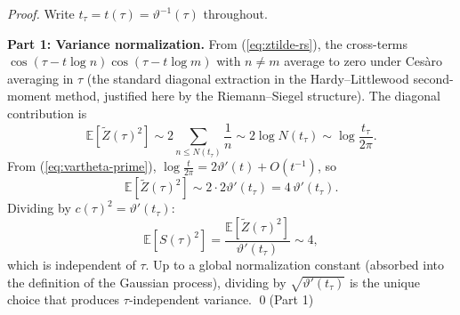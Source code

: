 \documentclass[11pt,a4paper]{article}
\begin{document}
\begin{proof}
Write $t_\tau=t(\tau)=\vartheta^{-1}(\tau)$ throughout.

\medskip\noindent\textbf{Part 1: Variance normalization.}
From (\ref{eq:ztilde-rs}), the cross-terms
$\cos(\tau-t\log n)\cos(\tau-t\log m)$ with $n\neq m$ average to zero
under Cesàro averaging in $\tau$ (the standard diagonal extraction in the
Hardy--Littlewood second-moment method, justified here by the Riemann--Siegel
structure). The diagonal contribution is
\begin{equation}
\label{eq:var-ztilde}
\mathbb{E}[\widetilde{Z}(\tau)^2]
\sim 2\sum_{n \le N(t_\tau)} \frac{1}{n}
\sim 2\log N(t_\tau)
\sim \log\frac{t_\tau}{2\pi}.
\end{equation}
From (\ref{eq:vartheta-prime}),
$\log\frac{t}{2\pi} = 2\vartheta'(t)+O(t^{-1})$, so
\begin{equation}
\mathbb{E}[\widetilde{Z}(\tau)^2] \sim 2\cdot 2\vartheta'(t_\tau)
= 4\,\vartheta'(t_\tau).
\end{equation}
Dividing by $c(\tau)^2=\vartheta'(t_\tau)$:
\begin{equation}
\mathbb{E}[S(\tau)^2]
= \frac{\mathbb{E}[\widetilde{Z}(\tau)^2]}{\vartheta'(t_\tau)}
\sim 4,
\end{equation}
which is independent of $\tau$.
Up to a global normalization constant (absorbed into the definition of the
Gaussian process), dividing by $\sqrt{\vartheta'(t_\tau)}$ is the unique
choice that produces $\tau$-independent variance. \qed (Part 1)


\end{proof}
\end{document}
